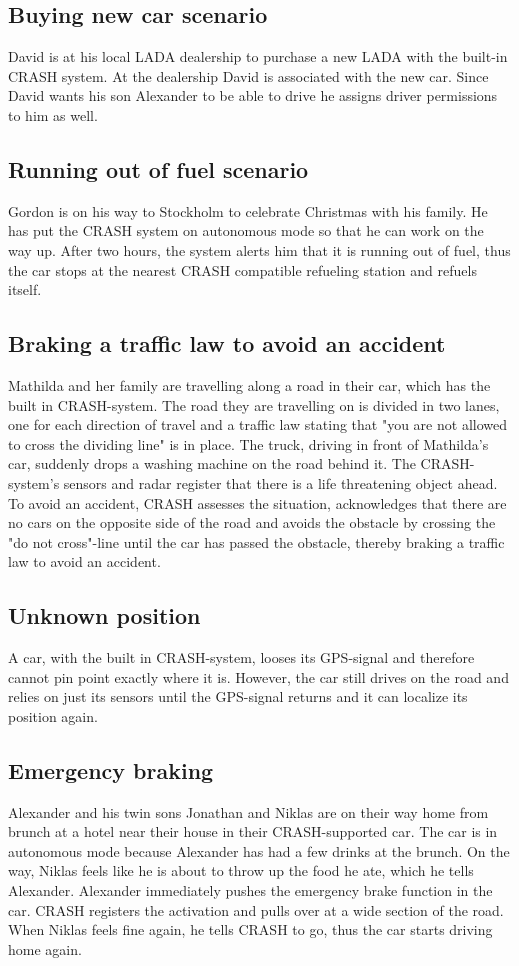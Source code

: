 \documentclass{article}
\begin{document}
\subsection {Buying new car scenario}
David is at his local LADA dealership to purchase a new LADA with the built-in CRASH system. At the dealership David is associated with the new car. Since David wants his son Alexander to be able to drive he assigns driver permissions to him as well.

\subsection {Running out of fuel scenario}
Gordon is on his way to Stockholm to celebrate Christmas with his family. He has put the CRASH system on autonomous mode so that he can work on the way up. After two hours, the system alerts him that it is running out of fuel, thus the car stops at the nearest CRASH compatible refueling station and refuels itself.

\subsection {Braking a traffic law to avoid an accident}
Mathilda and her family are travelling along a road in their car, which has the built in CRASH-system. The road they are travelling on is divided in two lanes, one for each direction of travel and a traffic law stating that "you are not allowed to cross the dividing line" is in place. The truck, driving in front of Mathilda's car, suddenly drops a washing machine on the road behind it. The CRASH-system's sensors and radar register that there is a life threatening object ahead. To avoid an accident, CRASH assesses the situation, acknowledges that there are no cars on the opposite side of the road and avoids the obstacle by crossing the "do not cross"-line until the car has passed the obstacle, thereby braking a traffic law to avoid an accident.

\subsection {Unknown position}
A car, with the built in CRASH-system, looses its GPS-signal and therefore cannot pin point exactly where it is. However, the car still drives on the road and relies on just its sensors until the GPS-signal returns and it can localize its position again.

\subsection {Emergency braking}
Alexander and his twin sons Jonathan and Niklas are on their way home from brunch at a hotel near their house in their CRASH-supported car. The car is in autonomous mode because Alexander has had a few drinks at the brunch. On the way, Niklas feels like he is about to throw up the food he ate, which he tells Alexander. Alexander immediately pushes the emergency brake function in the car. CRASH registers the activation and pulls over at a wide section of the road. When Niklas feels fine again, he tells CRASH to go, thus the car starts driving home again. 
\end{document}
